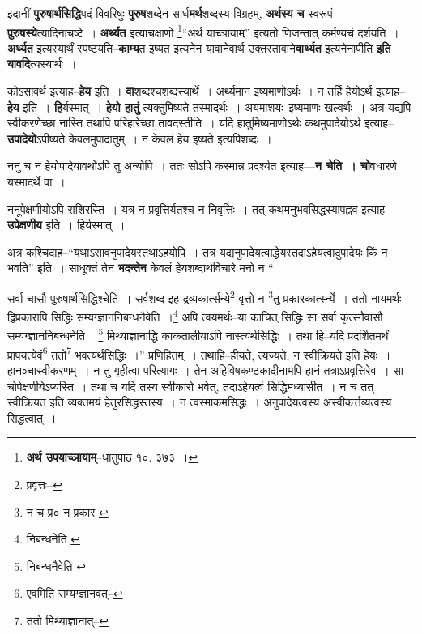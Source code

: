\documentclass[article,12pt,a4paper]{memoir}
\begin{document}
	  \pstart इदानीं \textbf{पुरुषार्थसिद्धि}पदं विवरिषुः \textbf{पुरुष}शब्देन सार्ध\textbf{मर्थ}शब्दस्य विग्रहम्, \textbf{अर्थस्य च} स्वरूपं \textbf{पुरुषस्ये}त्यादिनाचष्टे । \textbf{अर्थ्यत} इत्याचक्षाणो \footnote{\textbf{अर्थ उपयाच्ञायाम्}--धातुपाठ १०. ३७३ ।}“अर्थ याच्ञायाम्” इत्यतो णिजन्तात् कर्मण्यचं दर्शयति । \textbf{अर्थ्यत} इत्यस्यार्थं स्पष्टयति--\textbf{काम्य}त इष्यत इत्यनेन यावानेवार्थ उक्तस्तावाने\textbf{वार्थ्यत} इत्यनेनापीति \textbf{इति यावदि}त्यस्यार्थः ।
	\pend
      

	  \pstart कोऽसावर्थ इत्याह--\textbf{हेय} इति । \textbf{वा}शब्दश्चशब्दस्यार्थे । अर्थ्यमान इष्यमाणोऽर्थः । न तर्हि हेयोऽर्थ इत्याह--\textbf{हेय} इति । \textbf{हि}र्यस्मात् । \textbf{हेयो हातुं} त्यक्तुमिष्यते तस्मादर्थः । अयमाशयः--इष्यमाणः खल्वर्थः । अत्र यद्यपि स्वीकरणेच्छा नास्ति तथापि परिहारेच्छा तावदस्तीति । यदि हातुमिष्यमाणोऽर्थः कथमुपादेयोऽर्थ इत्याह--\textbf{उपादेयो}ऽपीष्यते केवलमुपादातुम् । न केवलं हेय इष्यते इत्यपिशब्दः ।
	\pend
      

	  \pstart ननु च न हेयोपादेयावर्थोऽपि तु अन्योपि । ततः सोऽपि कस्मान्न प्रदर्श्यत इत्याह—\textbf{न चेति । चो}वधारणे यस्मादर्थे वा ।
	\pend
      

	  \pstart ननूपेक्षणीयोऽपि राशिरस्ति । यत्र न प्रवृत्तिर्यतश्च न निवृत्तिः । तत् कथमनुभवसिद्धस्यापह्नव इत्याह--\textbf{उपेक्षणीय} इति । हिर्यस्मात् ।
	\pend
      

	  \pstart अत्र कश्चिदाह--“यथाऽसावनुपादेयस्तथाऽहयोपि । तत्र यद्यनुपादेयत्वाद्धेयस्तदाऽहेयत्वादुपादेयः किं न भवति” इति । साधूक्तं तेन \textbf{भदन्तेन} केवलं हेयशब्दार्थविचारे मनो न  \leavevmode{} “
	  
	सर्वा चासौ पुरुषार्थसिद्धिश्चेति । सर्वशब्द इह द्रव्यकार्त्सन्ये\footnote{प्रवृत्तः--\cite{dp-msD}} वृत्तो न \footnote{न च प्र० \cite{dp-msB} \cite{dp-edH} न प्रकार \cite{dp-msC} \cite{dp-edP} \cite{dp-edE}}\-तु प्रकारकार्त्स्न्ये । ततो नायमर्थः--द्विप्रकारापि सिद्धिः सम्यग्ज्ञाननिबन्धनैवेति ।\footnote{निबन्धनेति \cite{dp-msA} \cite{dp-msB} \cite{dp-msD} \cite{dp-edP} \cite{dp-edH} \cite{dp-edE}} अपि त्वयमर्थः--या काचित् सिद्धिः सा सर्वा कृत्स्नैवासौ सम्यग्ज्ञाननिबन्धनेति ।\footnote{निबन्धनैवेति \cite{dp-msA} \cite{dp-edP} \cite{dp-edH} \cite{dp-edE}} मिथ्याज्ञानाद्धि काकतालीयाऽपि नास्त्यर्थसिद्धिः । तथा हि--यदि प्रदर्शितमर्थं प्रापयत्येवं\footnote{एवमिति सम्यग्ज्ञानवत्--\cite{dp-msD-n}} ततो\footnote{ततो मिथ्याज्ञानात्--\cite{dp-msD-n}} भवत्यर्थसिद्धिः ।” प्रणिहितम् । तथाहि--हीयते, त्यज्यते, न स्वीक्रियते इति हेयः । हानञ्चास्वीकरणम् । न तु गृहीत्वा परित्यागः । तेन अहिविषकण्टकादीनामपि हानं तत्रा\leavevmode{}ऽप्रवृत्तिरेव । सा चोपेक्षणीयेऽप्यस्ति । तथा च यदि तस्य स्वीकारो भवेत्, तदाऽहेयत्वं सिद्धिमध्यासीत । न च तत् स्वीक्रियत इति व्यक्तमयं हेतुरसिद्धस्तस्य । न त्वस्माकमसिद्धः । अनुपादेयत्वस्य अस्वीकर्त्तव्यत्वस्य सिद्धत्वात् ।
	\pend
      
\end{document}
